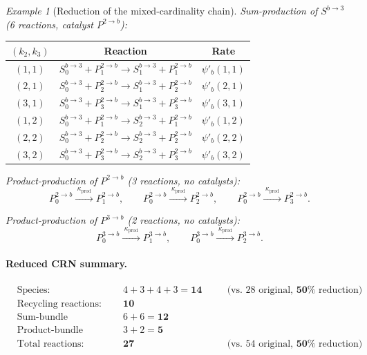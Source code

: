 \documentclass{article}
\theoremstyle{plain}
\theoremstyle{definition}
\theoremstyle{remark}
\newtheorem{example}{Example}[section]
\newcommand{\<}{\langle}
\renewcommand{\>}{\rangle}
\begin{document}
\begin{example}[Reduction of the mixed-cardinality chain]
\noindent\emph{Sum-production of $S^{b\to 3}$ (6 reactions, catalyst $P^{2\to b}$):}
\begin{center}
\renewcommand{\arraystretch}{1.3}
\begin{tabular}{@{}ccc@{}}
\toprule
$(k_2,k_3)$ & Reaction & Rate \\
\midrule
$(1,1)$ & $S^{b\to 3}_0 + P^{2\to b}_1 \to S^{b\to 3}_1 + P^{2\to b}_1$ & $\psi'_b(1,1)$ \\
$(2,1)$ & $S^{b\to 3}_0 + P^{2\to b}_2 \to S^{b\to 3}_1 + P^{2\to b}_2$ & $\psi'_b(2,1)$ \\
$(3,1)$ & $S^{b\to 3}_0 + P^{2\to b}_3 \to S^{b\to 3}_1 + P^{2\to b}_3$ & $\psi'_b(3,1)$ \\
$(1,2)$ & $S^{b\to 3}_0 + P^{2\to b}_1 \to S^{b\to 3}_2 + P^{2\to b}_1$ & $\psi'_b(1,2)$ \\
$(2,2)$ & $S^{b\to 3}_0 + P^{2\to b}_2 \to S^{b\to 3}_2 + P^{2\to b}_2$ & $\psi'_b(2,2)$ \\
$(3,2)$ & $S^{b\to 3}_0 + P^{2\to b}_3 \to S^{b\to 3}_2 + P^{2\to b}_3$ & $\psi'_b(3,2)$ \\
\bottomrule
\end{tabular}
\end{center}
 
\noindent\emph{Product-production of $P^{2\to b}$ (3 reactions, no catalysts):}
\[
P^{2\to b}_0 \xrightarrow{\;\kappa_{\mathrm{prod}}\;} P^{2\to b}_1,
\qquad
P^{2\to b}_0 \xrightarrow{\;\kappa_{\mathrm{prod}}\;} P^{2\to b}_2,
\qquad
P^{2\to b}_0 \xrightarrow{\;\kappa_{\mathrm{prod}}\;} P^{2\to b}_3.
\]
 
\noindent\emph{Product-production of $P^{3\to b}$ (2 reactions, no catalysts):}
\[
P^{3\to b}_0 \xrightarrow{\;\kappa_{\mathrm{prod}}\;} P^{3\to b}_1,
\qquad
P^{3\to b}_0 \xrightarrow{\;\kappa_{\mathrm{prod}}\;} P^{3\to b}_2.
\]
 
\paragraph{Reduced CRN summary.}
\[
\boxed{
\begin{aligned}
&\text{Species:} & &4+3+4+3 = \mathbf{14}
  &&\quad\text{(vs.\ 28 original, $\mathbf{50\%}$ reduction)} \\
&\text{Recycling reactions:} & &\mathbf{10} \\
&\text{Sum-bundle production:} & &6+6=\mathbf{12} \\
&\text{Product-bundle production:} & &3+2=\mathbf{5} \\
&\text{Total reactions:} & &\mathbf{27}
  &&\quad\text{(vs.\ 54 original, $\mathbf{50\%}$ reduction)}
\end{aligned}
}
\]
 

\end{example}
\end{document}
